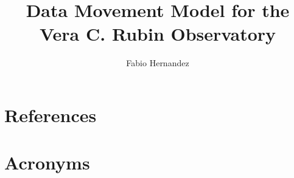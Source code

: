 \documentclass[DM,lsstdraft,authoryear,toc]{lsstdoc}
\title{Data Movement Model for the Vera C. Rubin Observatory}
\author{%
Fabio Hernandez
}
\date{\vcsDate}
\begin{document}
\maketitle


\appendix
\section{References} \label{sec:bib}
\renewcommand{\refname}{} %


\section{Acronyms} \label{sec:acronyms}

\end{document}
